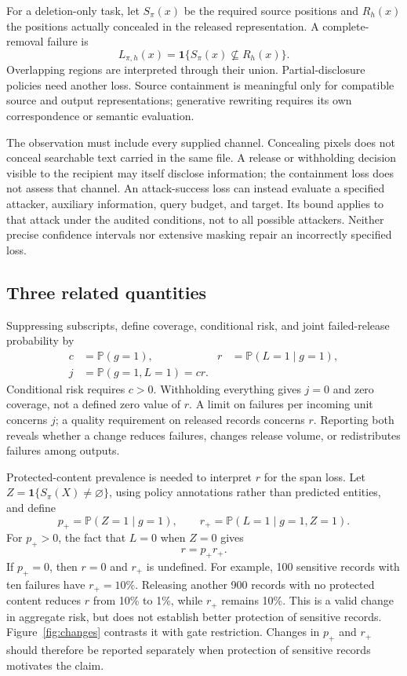 \documentclass[conference]{IEEEtran}
\newcommand{\Prb}{\mathbb{P}}
\newcommand{\ind}{\mathbf{1}}
\begin{document}
For a deletion-only task, let $S_\pi(x)$ be the required source positions and $R_h(x)$ the positions actually concealed in the released representation. A complete-removal failure is
\begin{equation}
 L_{\pi,h}(x)=\ind\{S_\pi(x)\not\subseteq R_h(x)\}.
 \label{eq:span}
\end{equation}
Overlapping regions are interpreted through their union. Partial-disclosure policies need another loss. Source containment is meaningful only for compatible source and output representations; generative rewriting requires its own correspondence or semantic evaluation.

The observation must include every supplied channel. Concealing pixels does not conceal searchable text carried in the same file. A release or withholding decision visible to the recipient may itself disclose information; the containment loss does not assess that channel. An attack-success loss can instead evaluate a specified attacker, auxiliary information, query budget, and target. Its bound applies to that attack under the audited conditions, not to all possible attackers. Neither precise confidence intervals nor extensive masking repair an incorrectly specified loss.

\subsection{Three related quantities}
Suppressing subscripts, define coverage, conditional risk, and joint failed-release probability by
\begin{align}
 c&=\Prb(g=1), & r&=\Prb(L=1\mid g=1),\label{eq:risk}\\
 j&=\Prb(g=1,L=1)=cr.&&\label{eq:joint}
\end{align}
Conditional risk requires $c>0$. Withholding everything gives $j=0$ and zero coverage, not a defined zero value of $r$. A limit on failures per incoming unit concerns $j$; a quality requirement on released records concerns $r$. Reporting both reveals whether a change reduces failures, changes release volume, or redistributes failures among outputs.

Protected-content prevalence is needed to interpret $r$ for the span loss. Let $Z=\ind\{S_\pi(X)\ne\varnothing\}$, using policy annotations rather than predicted entities, and define
\begin{equation}
 p_+=\Prb(Z=1\mid g=1),\qquad
 r_+=\Prb(L=1\mid g=1,Z=1).
\end{equation}
For $p_+>0$, the fact that $L=0$ when $Z=0$ gives
\begin{equation}
 r=p_+r_+.
 \label{eq:prevalence}
\end{equation}
If $p_+=0$, then $r=0$ and $r_+$ is undefined. For example, 100 sensitive records with ten failures have $r_+=10\%$. Releasing another 900 records with no protected content reduces $r$ from 10\% to 1\%, while $r_+$ remains 10\%. This is a valid change in aggregate risk, but does not establish better protection of sensitive records. Figure~\ref{fig:changes} contrasts it with gate restriction. Changes in $p_+$ and $r_+$ should therefore be reported separately when protection of sensitive records motivates the claim.
\end{document}

